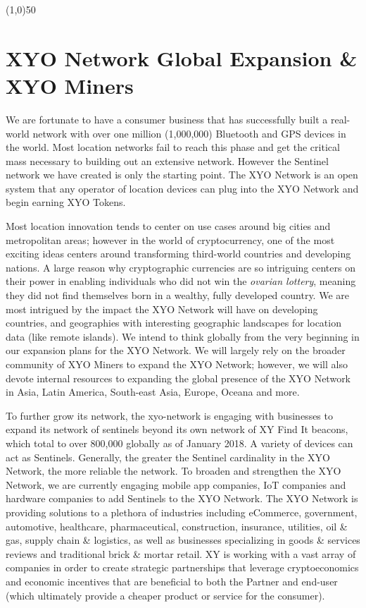 \documentclass{article}
\begin{document}
\begin{center}
\line(1,0){50}
\end{center}


\section {XYO Network Global Expansion \& XYO Miners}
We are fortunate to have a consumer business that has successfully built a real-world network with over one million (1,000,000) Bluetooth and GPS devices in the world. Most location networks fail to reach this phase and get the critical mass necessary to building out an extensive network. However the Sentinel network we have created is only the starting point. The XYO Network is an open system that any operator of location devices can plug into the XYO Network and begin earning XYO Tokens. 

Most location innovation tends to center on use cases around big cities and metropolitan areas; however in the world of cryptocurrency, one of the most exciting ideas centers around transforming third-world countries and developing nations. A large reason why cryptographic currencies are so intriguing centers on their power in enabling individuals who did not win the \textit{ovarian lottery}, meaning they did not find themselves born in a wealthy, fully developed country. We are most intrigued by the impact the XYO Network will have on developing countries, and geographies with interesting geographic landscapes for location data (like remote islands). We intend to think globally from the very beginning in our expansion plans for the XYO Network. We will largely rely on the broader community of XYO Miners to expand the XYO Network; however, we will also devote internal resources to expanding the global presence of the XYO Network in Asia, Latin America, South-east Asia, Europe, Oceana and more.

To further grow its network, the \Gls{xyo-network} is engaging with businesses to expand its network of \Glspl{sentinel} beyond its own network of XY Find It beacons, which total to over 800,000 globally as of January 2018. A variety of devices can act as Sentinels. Generally, the greater the Sentinel cardinality in the XYO Network, the more reliable the network. To broaden and strengthen the XYO Network, we are currently engaging mobile app companies, IoT companies and hardware companies to add Sentinels to the XYO Network. The XYO Network is providing solutions to a plethora of industries including eCommerce, government, automotive, healthcare, pharmaceutical, construction, insurance, utilities, oil \& gas, supply chain \& logistics, as well as businesses specializing in goods \& services reviews and traditional brick \& mortar retail. XY is working with a vast array of companies in order to create strategic partnerships that leverage \gls{cryptoeconomics} and economic incentives that are beneficial to both the Partner and end-user (which ultimately provide a cheaper product or service for the consumer).
\end{document}
